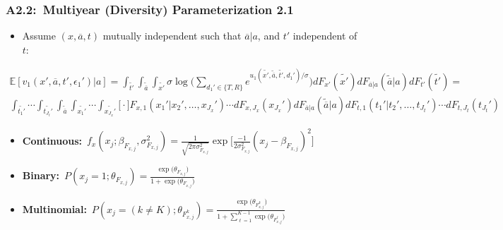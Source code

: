 \documentclass[12pt, aspectratio=169]{beamer}
\begin{document}
\begin{frame}[label=mdp21]
\frametitle{A2.2:\ Multiyear (Diversity) Parameterization 2.1}
\begin{itemize}
\item[$\bigstar$] Assume $(x,\overline{a},t)$ mutually independent such that $\overline{a}|a$, and $t'$ independent of $t$:
\end{itemize}
\footnotesize
\begin{multline*}
\mathbb{E}[v_1(x',\overline{a},t',\epsilon_1')|a] = \int_{\widetilde{t'}}\int_{\widetilde{\overline{a}}}\int_{\widetilde{x'}}\sigma\log\bigg(\sum_{d_1'\in\{T,R\}}e^{u_1(\widetilde{x'},\widetilde{\overline{a}},\widetilde{t'},d_1')/\sigma}\bigg)dF_{x'}(\widetilde{x'})dF_{\overline{a}|a}(\widetilde{\overline{a}}|a)dF_{t'}(\widetilde{t'}) = \\
\!\!\!\!\!\!\int_{\widetilde{t_1'}}\cdots\int_{\widetilde{t_{J_t}'}}\int_{\widetilde{\overline{a}}}\int_{\widetilde{x_1'}}\cdots\int_{\widetilde{x_{J_x}'}}\bigg[\cdot\bigg]F_{x,1}({x_1}'|{x_2}',\dots,{x_{J_x}}')\cdots dF_{x,{J_x}}({x_{J_x}}')dF_{\overline{a}|a}(\widetilde{\overline{a}}|a)dF_{t,1}({t_1}'|{t_2}',\dots,{t_{J_t}}')\cdots dF_{t,{J_t}}({t_{J_t}}')
\end{multline*}
\normalsize
\begin{itemize}
\item \textbf{Continuous:}\ $f_x(x_j;\beta_{F_{x,j}},\sigma^2_{F_{x,j}}) = \frac{1}{\sqrt{2\pi\sigma^2_{F_{x,j}}}}\exp\Big[\frac{-1}{2\sigma^2_{F_{x,j}}}(x_j-\beta_{F_{x,j}})^2\Big]$
\item \textbf{Binary:}\ $P(x_j=1;\theta_{F_{x,j}}) = \frac{\exp\big(\theta_{F_{x,j}}\big)}{1+\exp\big(\theta_{F_{x,j}}\big)}$
\item \textbf{Multinomial:}\ $P(x_j=(k\neq K);\theta_{F_{x,j}^k}) = \frac{\exp\Big(\theta_{F_{x,j}^k}\Big)}{1+\sum_{\ell=1}^{K-1}\exp\Big(\theta_{F_{x,j}^\ell}\Big)}$
\end{itemize}
\hyperlink{conc}{}
\end{frame}
\end{document}
